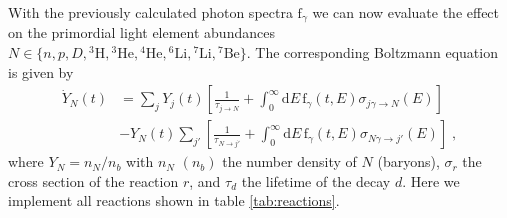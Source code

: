 \documentclass[11pt,a4paper]{article}
\newcommand{\fpdi}{\mathrm{f}}
\newcommand{\eqsp}{\;}
\begin{document}
With the previously calculated photon spectra $\fpdi_\gamma$ we can now evaluate the effect on the primordial light element abundances $N \in \{n, p, D, {}^3\mathrm{H}, {}^3\mathrm{He}, {}^4\mathrm{He}, {}^6\mathrm{Li}, {}^7\mathrm{Li}, {}^7\mathrm{Be} \}$. The corresponding Boltzmann equation is given by
\begin{align}
\dot{Y}_N(t) & = \sum_{j} Y_{j}(t) \left[\frac{1}{\tau_{j\rightarrow N}} + \int_{0}^{\infty} \text{d} E \, \fpdi_\gamma(t, E)\sigma_{j\gamma \rightarrow N}(E) \right] \nonumber \\
& - Y_N(t) \sum_{j'} \left[\frac{1}{\tau_{N\rightarrow j'}} + \int_{0}^{\infty} \text{d} E \, \fpdi_\gamma(t, E)\sigma_{N\gamma \rightarrow j'}(E) \right]\eqsp,
\label{eq:y_pdi}
\end{align}
where $Y_N = n_N / n_b$ with $n_N$ $(n_b)$ the number density of $N$ (baryons), $\sigma_r$ the cross section of the reaction $r$, and $\tau_d$ the lifetime of the decay $d$. Here we implement all reactions shown in table \ref{tab:reactions}.
\end{document}
